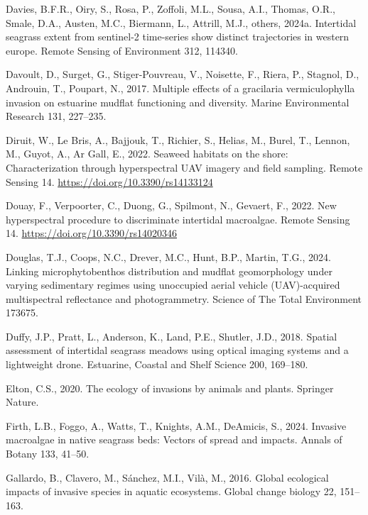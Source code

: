 \documentclass[
  letterpaper,
  DIV=11,
  numbers=noendperiod]{scrartcl}
\newlength{\cslhangindent}
\newenvironment{CSLReferences}[2] %
 {\begin{list}{}{%
  \setlength{\itemindent}{0pt}
  \setlength{\leftmargin}{0pt}
  \setlength{\parsep}{0pt}
  \ifodd #1
   \setlength{\leftmargin}{\cslhangindent}
   \setlength{\itemindent}{-1\cslhangindent}
  \fi
  \setlength{\itemsep}{#2\baselineskip}}}
 {\end{list}}
\begin{document}
\begin{CSLReferences}{1}{0}
Davies, B.F.R., Oiry, S., Rosa, P., Zoffoli, M.L., Sousa, A.I., Thomas,
O.R., Smale, D.A., Austen, M.C., Biermann, L., Attrill, M.J., others,
2024a. Intertidal seagrass extent from sentinel-2 time-series show
distinct trajectories in western europe. Remote Sensing of Environment
312, 114340.

Davoult, D., Surget, G., Stiger-Pouvreau, V., Noisette, F., Riera, P.,
Stagnol, D., Androuin, T., Poupart, N., 2017. Multiple effects of a
gracilaria vermiculophylla invasion on estuarine mudflat functioning and
diversity. Marine Environmental Research 131, 227--235.

Diruit, W., Le Bris, A., Bajjouk, T., Richier, S., Helias, M., Burel,
T., Lennon, M., Guyot, A., Ar Gall, E., 2022. Seaweed habitats on the
shore: Characterization through hyperspectral UAV imagery and field
sampling. Remote Sensing 14. \url{https://doi.org/10.3390/rs14133124}

Douay, F., Verpoorter, C., Duong, G., Spilmont, N., Gevaert, F., 2022.
New hyperspectral procedure to discriminate intertidal macroalgae.
Remote Sensing 14. \url{https://doi.org/10.3390/rs14020346}

Douglas, T.J., Coops, N.C., Drever, M.C., Hunt, B.P., Martin, T.G.,
2024. Linking microphytobenthos distribution and mudflat geomorphology
under varying sedimentary regimes using unoccupied aerial vehicle
(UAV)-acquired multispectral reflectance and photogrammetry. Science of
The Total Environment 173675.

Duffy, J.P., Pratt, L., Anderson, K., Land, P.E., Shutler, J.D., 2018.
Spatial assessment of intertidal seagrass meadows using optical imaging
systems and a lightweight drone. Estuarine, Coastal and Shelf Science
200, 169--180.

Elton, C.S., 2020. The ecology of invasions by animals and plants.
Springer Nature.

Firth, L.B., Foggo, A., Watts, T., Knights, A.M., DeAmicis, S., 2024.
Invasive macroalgae in native seagrass beds: Vectors of spread and
impacts. Annals of Botany 133, 41--50.

Gallardo, B., Clavero, M., Sánchez, M.I., Vilà, M., 2016. Global
ecological impacts of invasive species in aquatic ecosystems. Global
change biology 22, 151--163.


\end{CSLReferences}
\end{document}
